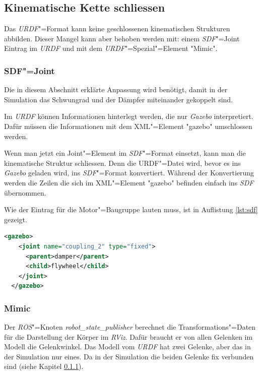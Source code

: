 
\subsection{Kinematische Kette schliessen}
\label{chap:kin-schliessen}
Das \textit{URDF}"=Format kann keine geschlossenen kinematischen Strukturen abbilden.
Dieser Mangel kann aber behoben werden mit: einem \textit{SDF}"=Joint Eintrag im \textit{URDF} und mit dem \textit{URDF}"=Spezial"=Element \textsc{"}Mimic\textsc{"}.

\subsubsection{SDF"=Joint}
\label{chap:sdf-joint}
Die in diesem Abschnitt erklärte Anpassung wird benötigt, damit in der Simulation das Schwungrad und der Dämpfer miteinander gekoppelt sind.

Im \textit{URDF} können Informationen hinterlegt werden, die nur \textit{Gazebo} interpretiert.
Dafür müssen die Informationen mit dem XML"=Element \textsc{"}gazebo\textsc{"} umschlossen werden.

Wenn man jetzt ein Joint"=Element im \textit{SDF}"=Format einsetzt, kann man die kinematische Struktur schliessen.
Denn die {URDF}"=Datei wird, bevor es ins \textit{Gazebo} geladen wird, ins \textit{SDF}"=Format konvertiert.
Während der Konvertierung werden die Zeilen die sich im XML"=Element \textsc{"}gazebo\textsc{"} befinden einfach ins \textit{SDF} übernommen.

Wie der Eintrag für die Motor"=Baugruppe lauten muss, ist in Auflistung \ref{lst:sdf} gezeigt.
\begin{lstlisting}[language=xml, captionpos=b, caption=SDF-Joint in URDF, label={lst:sdf}]
  <gazebo>
    <joint name="coupling_2" type="fixed">
      <parent>damper</parent>
      <child>flywheel</child>
    </joint>
  </gazebo>
\end{lstlisting}
\subsubsection{Mimic}
\label{chap:mimic}
Der \textit{ROS}"=Knoten \textit{robot\_state\_publisher} berechnet die Transformations"=Daten für die Darstellung der Körper im \textit{RViz}.
Dafür braucht er von allen Gelenken im Modell die Gelenkwinkel.
Das Modell vom \textit{URDF} hat zwei Gelenke, aber das in der Simulation nur eines.
Da in der Simulation die beiden Gelenke fix verbunden sind (siehe Kapitel \ref{chap:sdf-joint}).

